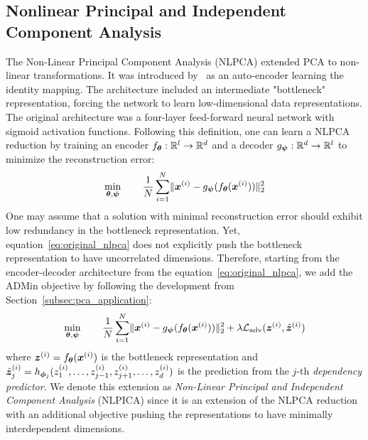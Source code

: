 \subsection{Nonlinear Principal and Independent Component Analysis} \label{subapp:nlpca_extension}

The Non-Linear Principal Component Analysis (NLPCA) extended PCA to non-linear transformations. 
It was introduced by~\cite{kramer1991autoencoder_nlpca} as an auto-encoder learning the identity mapping. The architecture included an intermediate "bottleneck" representation, forcing the network to learn low-dimensional data representations. 
The original architecture was a four-layer feed-forward neural network with sigmoid activation functions. 
Following this definition, one can learn a NLPCA reduction by training an encoder $f_{{\bm{\theta}}}: \mathbb{R}^l \to \mathbb{R}^d$ and a decoder $g_{{\bm{\psi}}}: \mathbb{R}^d \to \mathbb{R}^l$ to minimize the reconstruction error: 
\begin{equation} \label{eq:original_nlpca}
    \min_{{\bm{\theta}},{\bm{\psi}}} \quad \quad \frac{1}{N} \sum_{i=1}^N \lVert {\bm{x}}^{(i)} - g_{{\bm{\psi}}}(f_{{\bm{\theta}}}({\bm{x}}^{(i)})) \rVert_2^2
\end{equation}
One may assume that a solution with minimal reconstruction error should exhibit low redundancy in the bottleneck representation. 
Yet, equation~\ref{eq:original_nlpca} does not explicitly push the bottleneck representation to have uncorrelated dimensions. 
Therefore, starting from the encoder-decoder architecture from the equation~\ref{eq:original_nlpca}, we add the ADMin objective by following the development from Section~\ref{subsec:pca_application}:
\begin{equation}
    \min_{{\bm{\theta}},{\bm{\psi}}} \quad \quad \frac{1}{N} \sum_{i=1}^N \lVert {\bm{x}}^{(i)} - g_{{\bm{\psi}}}(f_{{\bm{\theta}}}({\bm{x}}^{(i)})) \rVert_2^2 
    + \lambda \mathcal{L}_{\mathrm{adv}}({\bm{z}}^{(i)}, \hat{{\bm{z}}}^{(i)})
\end{equation}
where ${\bm{z}}^{(i)} = f_{{\bm{\theta}}}({\bm{x}}^{(i)})$ is the bottleneck representation and $\hat{{\bm{z}}}^{(i)}_j = h_{{\bm{\phi}}_j}(z^{(i)}_1, \dots, z^{(i)}_{j-1}, z^{(i)}_{j+1}, \dots, z^{(i)}_d)$ is the prediction from the $j$-th \textit{dependency predictor}. 
We denote this extension as \textit{Non-Linear Principal and Independent Component Analysis} (NLPICA) since it is an extension of the NLPCA reduction with an additional objective pushing the representations to have minimally interdependent dimensions. 

